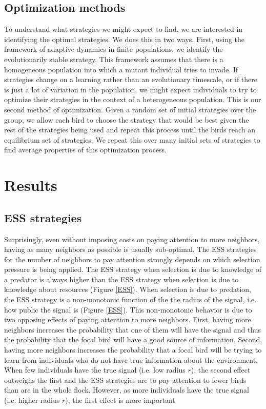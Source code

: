 \documentclass{article}
\begin{document}
\subsection{Optimization methods }
To understand what strategies we might expect to find, we are interested in identifying the optimal strategies.  We does this in two ways.  First, using the framework of adaptive dynamics in finite populations, we identify the evolutionarily stable strategy.  This framework assumes that there is a homogeneous population into which a mutant individual tries to invade.  If strategies change on a learning rather than an evolutionary timescale, or if there is just a lot of variation in the population, we might expect individuals to try to optimize their strategies in the context of a heterogeneous population.  This is our second method of optimization. Given a random set of initial strategies over the group, we allow each bird to choose the strategy that would be best given the rest of the strategies being used and repeat this process until the birds reach an equilibrium set of strategies. We repeat this over many initial sets of strategies to find average properties of this optimization process.

\section{Results }

\subsection{ESS strategies }
Surprisingly, even without imposing costs on paying attention to more neighbors, having as many neighbors as possible is usually sub-optimal. The ESS strategies for the number of neighbors to pay attention strongly depends on which selection pressure is being applied. The ESS strategy when selection is due to knowledge of a predator is always higher than the ESS strategy when selection is due to knowledge about resources (Figure \ref{ESS}). When selection is due to predation, the ESS strategy is a non-monotonic function of the the radius of the signal, i.e. how public the signal is (Figure \ref{ESS}). This non-monotonic behavior is due to two opposing effects of paying attention to more neighbors. First, having more neighbors increases the probability that one of them will have the signal and thus the probability that the focal bird will have a good source of information. Second, having more neighbors increases the probability that a focal bird will be trying to learn from individuals who do not have true information about the environment. When few individuals have the true signal (i.e. low radius $r$), the second effect outweighs the first and the ESS strategies are to pay attention to fewer birds than are in the whole flock. However, as more individuals have the true signal (i.e. higher radius $r$), the first effect is more important 
\end{document}

